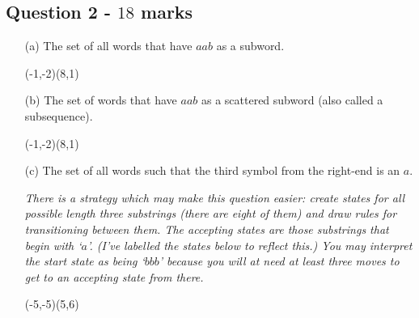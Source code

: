 \documentclass[12pt]{article}
\begin{document}
\subsection*{Question 2 - $18$ marks}
\begin{enumerate}
\item[(a)] The set of all words that have $aab$ as a subword.
\begin{center}
\begin{VCPicture}{(-1,-2)(8,1)}
\SmallState
{}
%
\end{VCPicture}
\end{center}
\item[(b)] The set of words that have $aab$ as a scattered subword (also called a subsequence).
\begin{center}
\begin{VCPicture}{(-1,-2)(8,1)}
\SmallState
{}
%
\end{VCPicture}
\end{center}

\item[(c)] The set of all words such that the third symbol from the right-end is an $a$.

\small\emph{There is a strategy which may make this question easier: create states for all possible length three substrings (there are eight of them) and draw rules for transitioning between them. The accepting states are those substrings that begin with `$a$'. (I've labelled the states below to reflect this.) You may interpret the start state as being `$bbb$' because you will at need at least three moves to get to an accepting state from there.}
\begin{center}
\begin{VCPicture}{(-5,-5)(5,6)}
\EdgeBorder
{}


\EdgeBorderOff
%
\end{VCPicture}
\end{center}
\end{enumerate}
\end{document}
